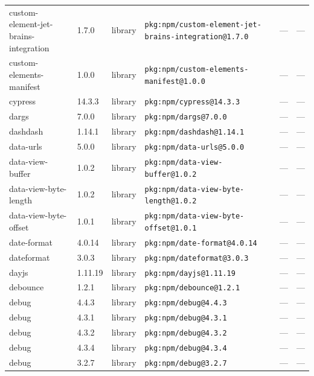\documentclass[11pt,a4paper]{article}
\begin{document}
\begin{longtable}{|p{4cm}|p{2cm}|p{1.6cm}|p{5cm}|p{1.5cm}|p{3.5cm}|}
\raggedright custom-element-jet-brains-integration & 1.7.0 & library & \small\texttt{pkg:npm/custom-element-jet-brains-integration@1.7.0} & — & \small — \\
\raggedright custom-elements-manifest & 1.0.0 & library & \small\texttt{pkg:npm/custom-elements-manifest@1.0.0} & — & \small — \\
\raggedright cypress & 14.3.3 & library & \small\texttt{pkg:npm/cypress@14.3.3} & — & \small — \\
\raggedright dargs & 7.0.0 & library & \small\texttt{pkg:npm/dargs@7.0.0} & — & \small — \\
\raggedright dashdash & 1.14.1 & library & \small\texttt{pkg:npm/dashdash@1.14.1} & — & \small — \\
\raggedright data-urls & 5.0.0 & library & \small\texttt{pkg:npm/data-urls@5.0.0} & — & \small — \\
\raggedright data-view-buffer & 1.0.2 & library & \small\texttt{pkg:npm/data-view-buffer@1.0.2} & — & \small — \\
\raggedright data-view-byte-length & 1.0.2 & library & \small\texttt{pkg:npm/data-view-byte-length@1.0.2} & — & \small — \\
\raggedright data-view-byte-offset & 1.0.1 & library & \small\texttt{pkg:npm/data-view-byte-offset@1.0.1} & — & \small — \\
\raggedright date-format & 4.0.14 & library & \small\texttt{pkg:npm/date-format@4.0.14} & — & \small — \\
\raggedright dateformat & 3.0.3 & library & \small\texttt{pkg:npm/dateformat@3.0.3} & — & \small — \\
\raggedright dayjs & 1.11.19 & library & \small\texttt{pkg:npm/dayjs@1.11.19} & — & \small — \\
\raggedright debounce & 1.2.1 & library & \small\texttt{pkg:npm/debounce@1.2.1} & — & \small — \\
\raggedright debug & 4.4.3 & library & \small\texttt{pkg:npm/debug@4.4.3} & — & \small — \\
\raggedright debug & 4.3.1 & library & \small\texttt{pkg:npm/debug@4.3.1} & — & \small — \\
\raggedright debug & 4.3.2 & library & \small\texttt{pkg:npm/debug@4.3.2} & — & \small — \\
\raggedright debug & 4.3.4 & library & \small\texttt{pkg:npm/debug@4.3.4} & — & \small — \\
\raggedright debug & 3.2.7 & library & \small\texttt{pkg:npm/debug@3.2.7} & — & \small — \\

\end{longtable}
\end{document}
